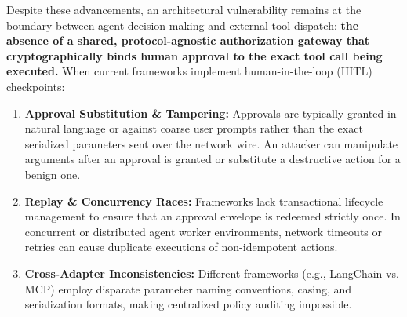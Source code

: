 \documentclass[sigconf,anonymous,review]{acmart}
\begin{document}
Despite these advancements, an architectural vulnerability remains at the boundary between agent decision-making and external tool dispatch: \textbf{the absence of a shared, protocol-agnostic authorization gateway that cryptographically binds human approval to the exact tool call being executed.} When current frameworks implement human-in-the-loop (HITL) checkpoints:
\begin{enumerate}
    \item \textbf{Approval Substitution \& Tampering:} Approvals are typically granted in natural language or against coarse user prompts rather than the exact serialized parameters sent over the network wire. An attacker can manipulate arguments after an approval is granted or substitute a destructive action for a benign one.
    \item \textbf{Replay \& Concurrency Races:} Frameworks lack transactional lifecycle management to ensure that an approval envelope is redeemed strictly once. In concurrent or distributed agent worker environments, network timeouts or retries can cause duplicate executions of non-idempotent actions.
    \item \textbf{Cross-Adapter Inconsistencies:} Different frameworks (e.g., LangChain vs. MCP) employ disparate parameter naming conventions, casing, and serialization formats, making centralized policy auditing impossible.
\end{enumerate}
\end{document}
